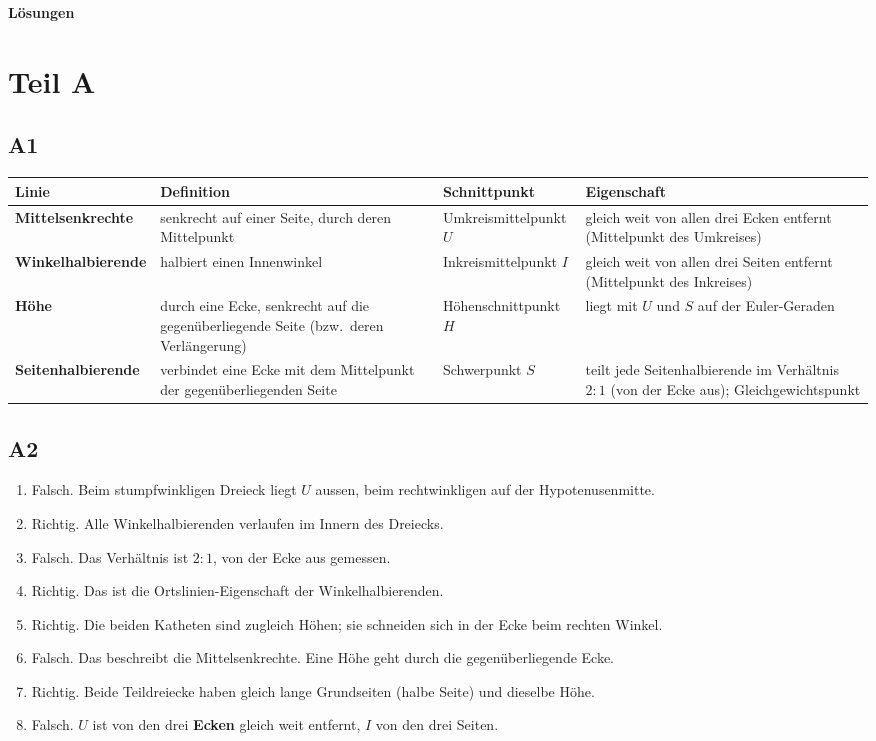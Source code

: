 \documentclass[11pt,a4paper]{article}
\begin{document}
\label{AufgabenEnde}
\newpage
\setcounter{page}{1}
{\LARGE\bfseries L\"osungen}

\section{Teil A}

\subsection{A1}
\small
\begin{tabularx}{\linewidth}{|>{\bfseries}P{3.1cm}|L|P{3cm}|L|}
\hline
Linie & \textbf{Definition} & \textbf{Schnittpunkt} & \textbf{Eigenschaft} \\ \hline
Mittelsenkrechte & senkrecht auf einer Seite, durch deren Mittelpunkt & Umkreis\-mittelpunkt $U$ & gleich weit von allen drei Ecken entfernt (Mittelpunkt des Umkreises) \\ \hline
Winkel\-halbierende & halbiert einen Innenwinkel & Inkreis\-mittelpunkt $I$ & gleich weit von allen drei Seiten entfernt (Mittelpunkt des Inkreises) \\ \hline
H\"ohe & durch eine Ecke, senkrecht auf die gegen\"uberliegende Seite (bzw.\ deren Verl\"angerung) & H\"ohen\-schnittpunkt $H$ & liegt mit $U$ und $S$ auf der Euler-Geraden \\ \hline
Seiten\-halbierende & verbindet eine Ecke mit dem Mittelpunkt der gegen\"uberliegenden Seite & Schwerpunkt $S$ & teilt jede Seitenhalbierende im Verh\"altnis $2:1$ (von der Ecke aus); Gleichgewichtspunkt \\ \hline
\end{tabularx}
\normalsize

\subsection{A2}
\begin{enumerate}
\item Falsch. Beim stumpfwinkligen Dreieck liegt $U$ aussen, beim rechtwinkligen auf der Hypotenusenmitte.
\item Richtig. Alle Winkelhalbierenden verlaufen im Innern des Dreiecks.
\item Falsch. Das Verh\"altnis ist $2:1$, von der Ecke aus gemessen.
\item Richtig. Das ist die Ortslinien-Eigenschaft der Winkelhalbierenden.
\item Richtig. Die beiden Katheten sind zugleich H\"ohen; sie schneiden sich in der Ecke beim rechten Winkel.
\item Falsch. Das beschreibt die Mittelsenkrechte. Eine H\"ohe geht durch die gegen\"uberliegende Ecke.
\item Richtig. Beide Teildreiecke haben gleich lange Grundseiten (halbe Seite) und dieselbe H\"ohe.
\item Falsch. $U$ ist von den drei \textbf{Ecken} gleich weit entfernt, $I$ von den drei Seiten.
\end{enumerate}
\end{document}
